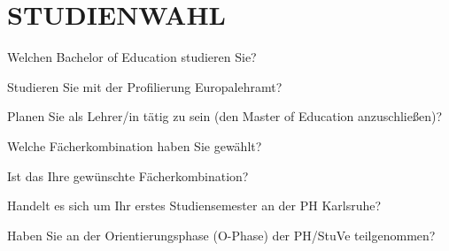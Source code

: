 
\section{\uppercase{Studienwahl}}
\vspace{.25cm}

\begin{choicequestion}[1]{Welchen Bachelor of Education studieren Sie?}
\end{choicequestion}

\separate

\begin{choicequestion}[1]{Studieren Sie mit der Profilierung Europalehramt?}
\end{choicequestion}

\separate

\begin{choicequestion}[1]{Planen Sie als Lehrer/in tätig zu sein (den Master of Education anzuschließen)?}
\end{choicequestion}

\separate

\begin{choicequestion}[1]{Welche Fächerkombination haben Sie gewählt?}
\end{choicequestion}

\separate

\begin{choicequestion}[1]{Ist das Ihre gewünschte Fächerkombination?}
\end{choicequestion}

\separate

\begin{choicequestion}[1]{Handelt es sich um Ihr erstes Studiensemester an der PH Karlsruhe?}
\end{choicequestion}

\separate

\begin{choicequestion}[1]{Haben Sie an der Orientierungsphase (O-Phase) der PH/StuVe teilgenommen?}
\end{choicequestion}
